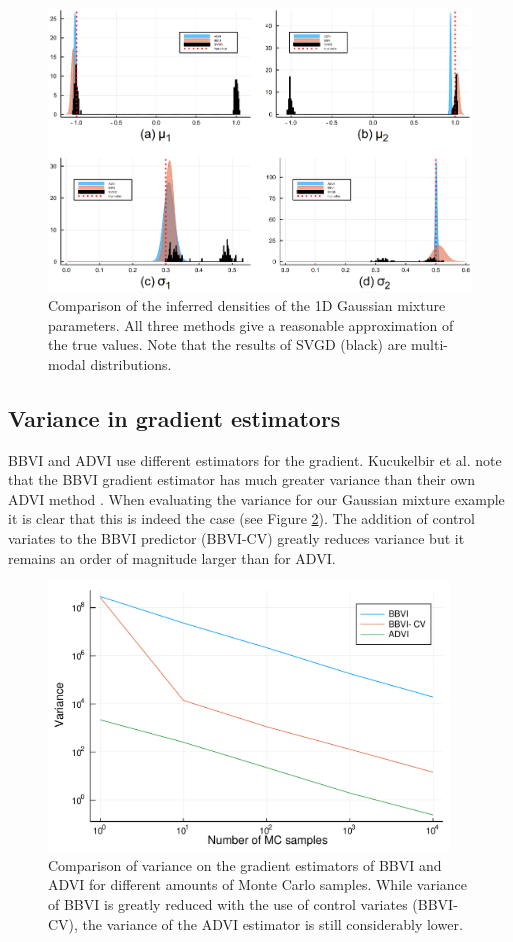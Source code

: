 \begin{figure}
	\centering
	\includegraphics[width=5in]{images/vi-comp.eps}
	\caption[Comparison of densities for VI methods.]{Comparison of the inferred densities of the 1D Gaussian mixture parameters. All three methods give a reasonable approximation of the true values. Note that the results of SVGD (black) are multi-modal distributions.}
    \label{fig:vi-comparison}
\end{figure}


\subsection{Variance in gradient estimators}
BBVI and ADVI use different estimators for the gradient. Kucukelbir et al. note that the BBVI gradient estimator has much greater variance than their own ADVI method \parencite{ADVI}. When evaluating the variance for our Gaussian mixture example it is clear that this is indeed the case (see Figure \ref{fig:vi-variance}). The addition of control variates to the BBVI predictor (BBVI-CV) greatly reduces variance but it remains an order of magnitude larger than for ADVI.

\begin{figure}
	\centering
	\includegraphics[width=4.2in]{images/variance_plot.pdf}
	\caption[Variance comparison of BBVI and ADVI.]{Comparison of variance on the gradient estimators of BBVI and ADVI for different amounts of Monte Carlo samples. While variance of BBVI is greatly reduced with the use of control variates (BBVI-CV), the variance of the ADVI estimator is still considerably lower.}
    \label{fig:vi-variance}
\end{figure}


